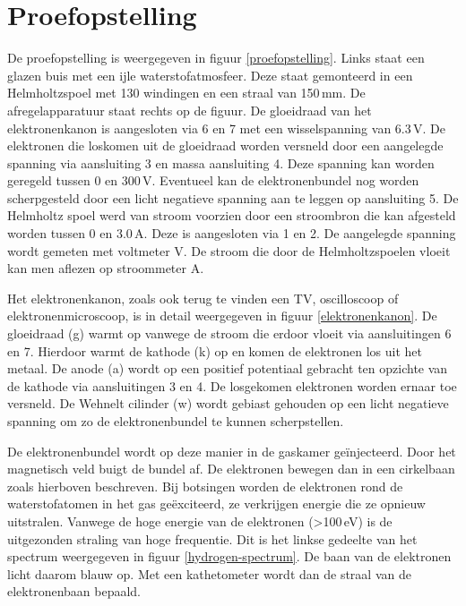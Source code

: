 \section{Proefopstelling}


De proefopstelling is weergegeven in figuur \ref{proefopstelling}. Links staat 
een glazen buis met een ijle waterstofatmosfeer. Deze staat gemonteerd in een 
Helmholtzspoel met 130 windingen en een straal van 150\,mm. De 
afregelapparatuur staat rechts op de figuur. De gloeidraad van het 
elektronenkanon is aangesloten via 6 en 7 met een wisselspanning van 6.3\,V. De 
elektronen die loskomen uit de gloeidraad worden versneld door een aangelegde 
spanning via aansluiting 3 en massa aansluiting 4. Deze spanning kan worden 
geregeld tussen 0 en 300\,V. Eventueel kan de elektronenbundel nog worden 
scherpgesteld door een licht negatieve spanning aan te leggen op aansluiting 5.  
De Helmholtz spoel werd van stroom voorzien door een stroombron die kan 
afgesteld worden tussen 0 en 3.0\,A. Deze is aangesloten via 1 en 2. De 
aangelegde spanning wordt gemeten met voltmeter V. De stroom die door de 
Helmholtzspoelen vloeit kan men aflezen op stroommeter A.


Het elektronenkanon, zoals ook terug te vinden een TV, oscilloscoop of 
elektronenmicroscoop, is in detail weergegeven in figuur \ref{elektronenkanon}.  
De gloeidraad (g) warmt op vanwege de stroom die erdoor vloeit via 
aansluitingen 6 en 7. Hierdoor warmt de kathode (k) op en komen de elektronen 
los uit het metaal. De anode (a) wordt op een positief potentiaal gebracht ten 
opzichte van de kathode via aansluitingen 3 en 4.  De losgekomen elektronen 
worden ernaar toe versneld.  De Wehnelt cilinder (w) wordt gebiast gehouden op 
een licht negatieve spanning om zo de elektronenbundel te kunnen scherpstellen.

De elektronenbundel wordt op deze manier in de gaskamer ge\"injecteerd. Door 
het magnetisch veld buigt de bundel af. De elektronen bewegen dan in een 
cirkelbaan zoals hierboven beschreven. Bij botsingen worden de elektronen rond 
de waterstofatomen in het gas ge\"exciteerd, ze verkrijgen energie die ze 
opnieuw uitstralen. Vanwege de hoge energie van de elektronen 
(\textgreater100\,eV) is de uitgezonden straling van hoge frequentie. Dit is 
het linkse gedeelte van het spectrum weergegeven in figuur 
\ref{hydrogen-spectrum}. De baan van de elektronen licht daarom blauw op.  Met 
een kathetometer wordt dan de straal van de elektronenbaan bepaald.

